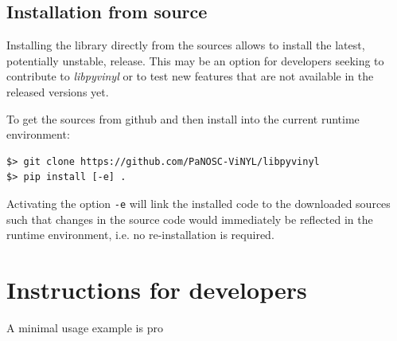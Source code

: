 \documentclass[10pt]{scrartcl}
\begin{document}
\subsection{Installation from source}
\label{sec:source}

Installing the library directly from the sources allows to install the latest,
potentially unstable, release. This may be an option for developers seeking to
contribute to \textit{libpyvinyl} or to test new features that are not available
in the released versions yet.

To get the sources from github and then install into the current runtime environment:
\begin{verbatim}
$> git clone https://github.com/PaNOSC-ViNYL/libpyvinyl
$> pip install [-e] .
\end{verbatim}
Activating the option \texttt{-e} will link the installed code to the downloaded
sources such that changes in the source code would immediately be reflected in
the runtime environment, i.e. no re-installation is required.

\section{Instructions for developers}
\label{sec:dev}
A minimal usage example is pro
\end{document}
